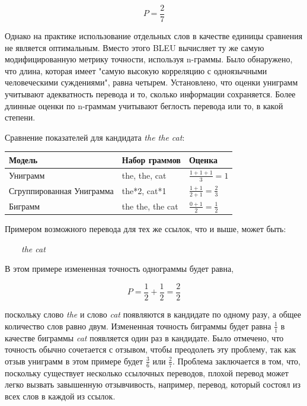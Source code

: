     $$
        P = \frac{2}{7}
    $$
    
    Однако на практике использование отдельных слов в качестве единицы сравнения не является оптимальным. Вместо этого BLEU вычисляет ту же самую модифицированную метрику точности, используя n-граммы. Было обнаружено, что длина, которая имеет "самую высокую корреляцию с одноязычными человеческими суждениями", равна четырем. Установлено, что оценки униграмм учитывают адекватность перевода и то, сколько информации сохраняется. Более длинные оценки по n-граммам учитывают беглость перевода или то, в какой степени.
    
    Сравнение показателей для кандидата \textit{the the cat}:
    
    \begin{table}[h]
        \centering
        \begin{tabular}{|l|l|l|}
        \hline
        Модель                    & Набор граммов    & Оценка \\ \hline
        Униграмм                  & the, the, cat    & $\frac{1+1+1}{3} = 1$      \\ \hline
        Сгруппированная Униграмма & the*2, cat*1     & $\frac{1+1}{2+1} = \frac{2}{3}$      \\ \hline
        Биграмм                   & the the, the cat & $\frac{0+1}{2} = \frac{1}{2}$       \\ \hline
        \end{tabular}
    \end{table}
    
    Примером возможного перевода для тех же ссылок, что и выше, может быть:
    
    \ \ \ \ \textit{the cat}
    
    В этом примере измененная точность однограммы будет равна,
    
    $$
        P = \frac{1}{2} + \frac{1}{2} = \frac{2}{2}
    $$
    
    поскольку слово \textit{the} и слово \textit{cat} появляются в кандидате по одному разу, а общее количество слов равно двум. Измененная точность биграммы будет равна $\frac{1}{1}$ в качестве биграммы \textit{cat} появляется один раз в кандидате. Было отмечено, что точность обычно сочетается с отзывом, чтобы преодолеть эту проблему, так как отзыв униграмм в этом примере будет $\frac{3}{6}$ или $\frac{2}{7}$. Проблема заключается в том, что, поскольку существует несколько ссылочных переводов, плохой перевод может легко вызвать завышенную отзывчивость, например, перевод, который состоял из всех слов в каждой из ссылок.
	\clearpage
	
